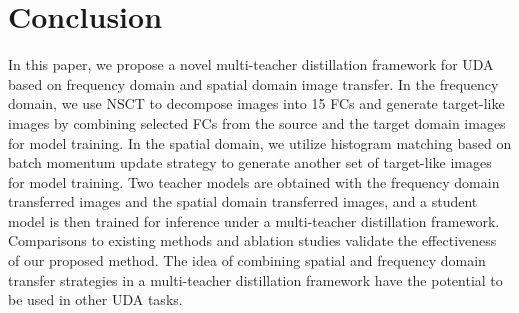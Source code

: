 \documentclass[letterpaper]{article} %
\begin{document}
\begin{table}[htbp]
    \small
    \centering
    \caption{Experimental results of different histogram matching strategies on cardiac datasets
    (source domain: MRI, target domain: CT)}
    \label{table4}%
  \end{table}%


\section{Conclusion}
In this paper, we propose a novel multi-teacher distillation framework for UDA based on frequency
domain and spatial domain image transfer. In the frequency domain, we use NSCT to decompose images
into 15 FCs and generate target-like images by combining selected FCs from the source and the target
domain images for model training. In the spatial domain, we utilize histogram matching based on batch
momentum update strategy to generate another set of target-like images for model training. Two teacher
models are obtained with the frequency domain transferred images and the spatial domain transferred
images, and a student model is then trained for inference under a multi-teacher distillation framework.
Comparisons to existing methods and ablation studies validate the effectiveness of our proposed method.
The idea of combining spatial and frequency domain transfer strategies in a multi-teacher distillation
framework have the potential to be used in other UDA tasks.
\end{document}

